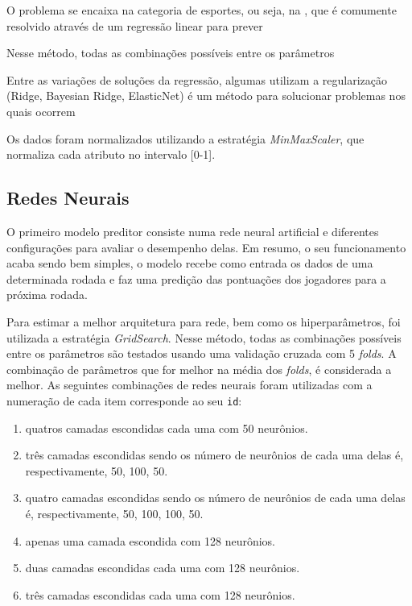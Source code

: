 \documentclass[conference]{IEEEtran}
\newcommand{\ttt}[1]{{\texttt{#1}}}
\newcommand{\tit}[1]{{\textit{#1}}}
\begin{document}
O problema se encaixa na categoria de esportes, ou seja, na , que é comumente
resolvido através de um regressão linear para prever

Nesse método, todas as  combinações possíveis entre os parâmetros

Entre as variações de soluções da regressão, algumas utilizam
a regularização (Ridge, Bayesian Ridge, ElasticNet)
é um método para solucionar problemas nos quais ocorrem

Os    dados    foram    normalizados    utilizando    a    estratégia
\tit{MinMaxScaler}, que normaliza cada atributo no intervalo [0-1].

\subsection{Redes Neurais}

O  primeiro modelo  preditor consiste  numa rede  neural artificial  e
diferentes configurações para avaliar o desempenho delas. Em resumo,
o  seu funcionamento  acaba sendo  bem simples,  o modelo  recebe como
entrada os  dados de uma determinada  rodada e faz uma  predição das
pontuações dos jogadores para a próxima rodada.

Para   estimar  a   melhor  arquitetura   para  rede,   bem  como   os
hiperparâmetros,  foi  utilizada a  estratégia  \textit{GridSearch}.
Nesse método, todas as  combinações possíveis entre os parâmetros
são  testados usando  uma validação  cruzada com  5 \tit{folds}.  A
combinação de parâmetros que for  melhor na média dos \tit{folds},
é considerada a  melhor. As seguintes combinações  de redes neurais
foram utilizadas  com a  numeração de cada  item corresponde  ao seu
\ttt{id}:

\begin{enumerate}

\item quatros camadas escondidas cada uma com 50 neurônios.

\item três camadas escondidas sendo  os número de neurônios de cada
uma delas é, respectivamente, 50, 100, 50.

\item quatro camadas escondidas sendo os número de neurônios de cada
uma delas é, respectivamente, 50, 100, 100, 50.

\item apenas uma camada escondida com 128 neurônios.

\item duas camadas escondidas cada uma com 128 neurônios.

\item três camadas escondidas cada uma com 128 neurônios.

\end{enumerate}
\end{document}
